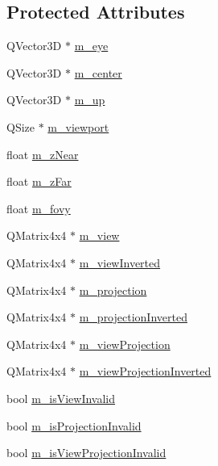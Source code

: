 \subsection*{Protected Attributes}
\begin{DoxyCompactItemize}
\item 
Q\+Vector3\+D $\ast$ \hyperlink{class_camera_a227e5fd463e3bea92f376d8a9d7cee7e}{m\+\_\+eye}
\item 
Q\+Vector3\+D $\ast$ \hyperlink{class_camera_a7048a9ea478532b36678d4d2d07c6dd6}{m\+\_\+center}
\item 
Q\+Vector3\+D $\ast$ \hyperlink{class_camera_af30016ca4d7348e14462f3147add42ec}{m\+\_\+up}
\item 
Q\+Size $\ast$ \hyperlink{class_camera_ac6968a6be1441d8947d3376e983c592e}{m\+\_\+viewport}
\item 
float \hyperlink{class_camera_ae77d866ea9d0aa75853c8243154fca82}{m\+\_\+z\+Near}
\item 
float \hyperlink{class_camera_aa1aaffbfe1f859ff06ae57f7c1faa208}{m\+\_\+z\+Far}
\item 
float \hyperlink{class_camera_ae537e927f6648b6ce7054e0ff54442b9}{m\+\_\+fovy}
\item 
Q\+Matrix4x4 $\ast$ \hyperlink{class_camera_ac11306608e9187c2ff52e0b949cdc5b3}{m\+\_\+view}
\item 
Q\+Matrix4x4 $\ast$ \hyperlink{class_camera_a06be12235980a27d0e529de166117b3e}{m\+\_\+view\+Inverted}
\item 
Q\+Matrix4x4 $\ast$ \hyperlink{class_camera_a23f540bd415235c5b917322e8a333996}{m\+\_\+projection}
\item 
Q\+Matrix4x4 $\ast$ \hyperlink{class_camera_a406e8638e0676defdc5757ed2733e401}{m\+\_\+projection\+Inverted}
\item 
Q\+Matrix4x4 $\ast$ \hyperlink{class_camera_a00e4c0e94057379c97e8c71fd69995f7}{m\+\_\+view\+Projection}
\item 
Q\+Matrix4x4 $\ast$ \hyperlink{class_camera_a29e1c120c55810920954e335eb60e84e}{m\+\_\+view\+Projection\+Inverted}
\item 
bool \hyperlink{class_camera_a07a7666a3529761624675f4f1771f1c7}{m\+\_\+is\+View\+Invalid}
\item 
bool \hyperlink{class_camera_a62264f74f2fb442e8d94e5c0a44098f0}{m\+\_\+is\+Projection\+Invalid}
\item 
bool \hyperlink{class_camera_a34a4ccea1f4f66eb140db34ef7bdf11a}{m\+\_\+is\+View\+Projection\+Invalid}
\end{DoxyCompactItemize}


